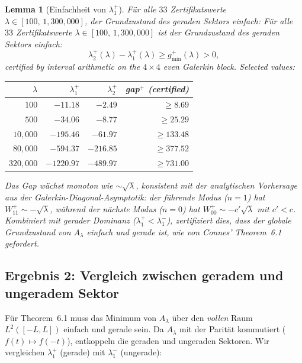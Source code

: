 \documentclass[12pt,a4paper]{article}
\newtheorem{lemma}[theorem]{Lemma}
\theoremstyle{definition}
\theoremstyle{remark}
\begin{document}
\begin{lemma}[Einfachheit von $\lambda_1^+$]
\label{lem:simplicity}
Für alle $33$ Zertifikatswerte $\lambda \in [100,\, 1{,}300{,}000]$, der Grundzustand des geraden Sektors einfach:
Für alle $33$ Zertifikatswerte $\lambda \in [100,\, 1{,}300{,}000]$ ist der Grundzustand des geraden Sektors einfach:
\[
  \lambda_2^+(\lambda) - \lambda_1^+(\lambda) \geq g_{\min}^+(\lambda) > 0,
\]
certified by interval arithmetic on the $4 \times 4$ even Galerkin block. Selected values:

\medskip
\begin{center}
\renewcommand{\arraystretch}{1.15}
\begin{tabular}{r|r|r|r}
$\lambda$ & $\lambda_1^+$ & $\lambda_2^+$ & gap$^+$ (certified) \\\hline
$100$ & $-11.18$ & $-2.49$ & $\geq 8.69$ \\
$500$ & $-34.06$ & $-8.77$ & $\geq 25.29$ \\
$10{,}000$ & $-195.46$ & $-61.97$ & $\geq 133.48$ \\
$80{,}000$ & $-594.37$ & $-216.85$ & $\geq 377.52$ \\
$320{,}000$ & $-1220.97$ & $-489.97$ & $\geq 731.00$
\end{tabular}
\end{center}

\medskip\noindent
Das Gap wächst monoton wie $\sim\!\sqrt{\lambda}$, konsistent mit der analytischen Vorhersage aus der Galerkin-Diagonal-Asymptotik: der führende Modus ($n = 1$) hat $W_{11}^+ \sim -\sqrt{\lambda}$, während der nächste Modus ($n = 0$) hat $W_{00}^+ \sim -c'\sqrt{\lambda}$ mit $c' < c$. Kombiniert mit gerader Dominanz ($\lambda_1^+ < \lambda_1^-$), zertifiziert dies, dass der globale Grundzustand von $A_\lambda$ einfach und gerade ist, wie von Connes' Theorem~6.1 gefordert.
\end{lemma}

\subsection{Ergebnis 2: Vergleich zwischen geradem und ungeradem Sektor}

Für Theorem~6.1 muss das Minimum von $A_\lambda$ über den \emph{vollen} Raum $L^2([-L,L])$ einfach und gerade sein. Da $A_\lambda$ mit der Parität kommutiert ($f(t)\mapsto f(-t)$), entkoppeln die geraden und ungeraden Sektoren. Wir vergleichen $\lambda_1^+$ (gerade) mit $\lambda_1^-$ (ungerade):
\end{document}
